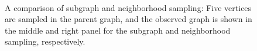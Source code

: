 \begin{figure}[ht]
	\centering
         ~~ \hspace{1cm}
         ~~ \hspace{1cm}
\caption{A comparison of subgraph and neighborhood sampling:
Five vertices are sampled in the parent graph, and the observed graph is shown in the middle and right panel for the subgraph and neighborhood sampling, respectively.
}
	\label{fig:example}
\end{figure}


